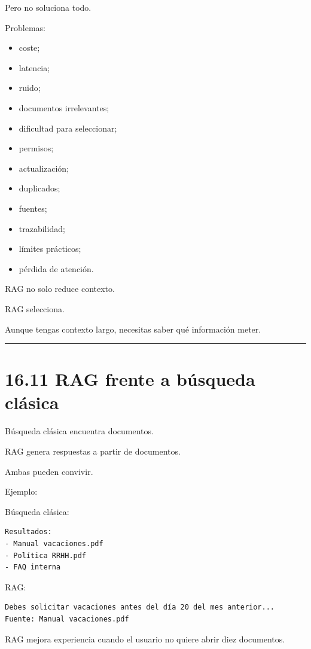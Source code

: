Pero no soluciona todo.

Problemas:

\begin{itemize}
\tightlist
\item
  coste;
\item
  latencia;
\item
  ruido;
\item
  documentos irrelevantes;
\item
  dificultad para seleccionar;
\item
  permisos;
\item
  actualización;
\item
  duplicados;
\item
  fuentes;
\item
  trazabilidad;
\item
  límites prácticos;
\item
  pérdida de atención.
\end{itemize}

RAG no solo reduce contexto.

RAG selecciona.

Aunque tengas contexto largo, necesitas saber qué información meter.

\begin{center}\rule{0.5\linewidth}{0.5pt}\end{center}

\section{16.11 RAG frente a búsqueda
clásica}\label{rag-frente-a-buxfasqueda-cluxe1sica}

Búsqueda clásica encuentra documentos.

RAG genera respuestas a partir de documentos.

Ambas pueden convivir.

Ejemplo:

Búsqueda clásica:

\begin{lstlisting}
Resultados:
- Manual vacaciones.pdf
- Política RRHH.pdf
- FAQ interna
\end{lstlisting}

RAG:

\begin{lstlisting}
Debes solicitar vacaciones antes del día 20 del mes anterior...
Fuente: Manual vacaciones.pdf
\end{lstlisting}

RAG mejora experiencia cuando el usuario no quiere abrir diez
documentos.

